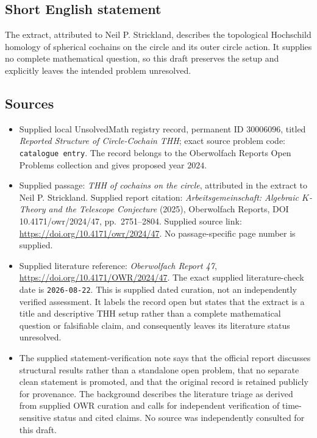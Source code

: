 \documentclass[11pt]{article}
\begin{document}
\subsection{Short English statement}
The extract, attributed to Neil P. Strickland, describes the topological Hochschild homology of spherical cochains on the circle and its outer circle action. It supplies no complete mathematical question, so this draft preserves the setup and explicitly leaves the intended problem unresolved.
\subsection{Sources}
\begin{itemize}
\item Supplied local UnsolvedMath registry record, permanent ID \(30006096\), titled \emph{Reported Structure of Circle-Cochain THH}; exact source problem code: \texttt{catalogue entry}. The record belongs to the Oberwolfach Reports Open Problems collection and gives proposed year \(2024\).
\item Supplied passage: \emph{THH of cochains on the circle}, attributed in the extract to Neil P. Strickland. Supplied report citation: \emph{Arbeitsgemeinschaft: Algebraic \(K\)-Theory and the Telescope Conjecture} (2025), Oberwolfach Reports, DOI 10.4171/owr/2024/47, pp.~2751--2804. Supplied source link: \url{https://doi.org/10.4171/owr/2024/47}. No passage-specific page number is supplied.
\item Supplied literature reference: \emph{Oberwolfach Report 47}, \url{https://doi.org/10.4171/OWR/2024/47}. The exact supplied literature-check date is \texttt{2026-08-22}. This is supplied dated curation, not an independently verified assessment. It labels the record open but states that the extract is a title and descriptive THH setup rather than a complete mathematical question or falsifiable claim, and consequently leaves its literature status unresolved.
\item The supplied statement-verification note says that the official report discusses structural results rather than a standalone open problem, that no separate clean statement is promoted, and that the original record is retained publicly for provenance. The background describes the literature triage as derived from supplied OWR curation and calls for independent verification of time-sensitive status and cited claims. No source was independently consulted for this draft.
\end{itemize}
\end{document}

